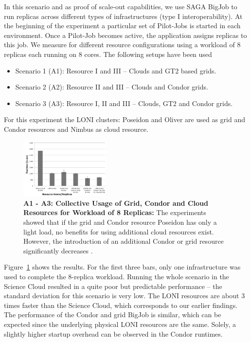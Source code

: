 \documentclass[3p,twocolumn]{elsarticle}
\begin{document}

In this scenario and as proof of scale-out capabilities, we use SAGA
BigJob to run replicas across different types of infrastructures (type I 
interoperability).
At the beginning of the experiment a particular set of Pilot-Jobs is
started in each environment. Once a Pilot-Job becomes active, the
application assigns replicas to this job.  We measure \tc for different
resource configurations using a workload of 8 replicas each running on
8 cores. The following setups have been used
\begin{itemize}
\item Scenario 1 (A1): Resource I and III -- Clouds and GT2 based grids. 
\item Scenario 2 (A2): Resource II and III -- Clouds and Condor grids.
\item Scenario 3 (A3): Resource I, II and III -- Clouds, GT2 and Condor grids.
\end{itemize} 
For this experiment the LONI clusters: Poseidon and Oliver are used as
grid and Condor resources and Nimbus as cloud resource.

\begin{figure}[tbp]
    \centering
        \includegraphics[width=0.4\textwidth]{figures/8replica_scenario_grid_condor_cloud}
        \caption{
          \footnotesize
          \label{fig:performance_8replica_grid_cloud_condor}
          \textbf{A1 - A3: Collective Usage of Grid, Condor and
          Cloud Resources for Workload of 8 Replicas: } The experiments showed 
          that if the grid and Condor resource Poseidon has only a light load, 
          no benefits for using additional cloud resources exist. However, the 
          introduction of an additional Condor or grid resource significantly 
          decreases \tc.}
\end{figure}

Figure~\ref{fig:performance_8replica_grid_cloud_condor} shows the
results. For the first three bars, only one infrastructure was used to
complete the 8-replica workload. Running the whole scenario in the
Science Cloud resulted in a quite poor but predictable performance --
the standard deviation for this scenario is very low. The LONI
resources are about 3 times faster than the Science Cloud, which
corresponds to our earlier findings.  The performance of the Condor
and grid BigJob is similar, which can be expected since the underlying
physical LONI resources are the same.  Solely, a slightly higher
startup overhead can be observed in the Condor runtimes.
\end{document}
